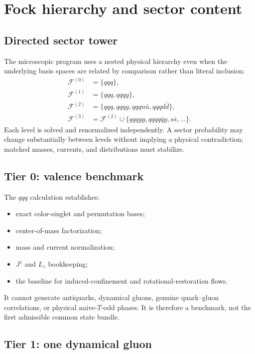 \documentclass[11pt]{article}
\newcommand{\cF}{\mathcal F}
\newcommand{\Lz}{L_z}
\newcommand{\Jz}{J^z}
\begin{document}
\section{Fock hierarchy and sector content}
\label{sec:fock}

\subsection{Directed sector tower}

The microscopic program uses a nested physical hierarchy even when the
underlying basis spaces are related by comparison rather than literal inclusion:
\begin{align}
 \cF^{(0)}&=\{qqq\},
 \label{eq:fock0}\\
 \cF^{(1)}&=\{qqq,qqqg\},
 \label{eq:fock1}\\
 \cF^{(2)}&=\{qqq,qqqg,qqqu\bar u,qqqd\bar d\},
 \label{eq:fock2}\\
 \cF^{(3)}&=\cF^{(2)}\cup\{qqqgg,qqqq\bar q g,s\bar s,\ldots\}.
 \label{eq:fock3}
\end{align}
Each level is solved and renormalized independently.  A sector probability may
change substantially between levels without implying a physical contradiction;
matched masses, currents, and distributions must stabilize.

\subsection{Tier 0: valence benchmark}

The \(qqq\) calculation establishes:
\begin{itemize}
 \item exact color-singlet and permutation bases;
 \item center-of-mass factorization;
 \item mass and current normalization;
 \item \(\Jz\) and \(\Lz\) bookkeeping;
 \item the baseline for induced-confinement and rotational-restoration flows.
\end{itemize}
It cannot generate antiquarks, dynamical gluons, genuine quark--gluon
correlations, or physical naive-\(T\)-odd phases.  It is therefore a benchmark,
not the first admissible common state bundle.

\subsection{Tier 1: one dynamical gluon}
\end{document}
